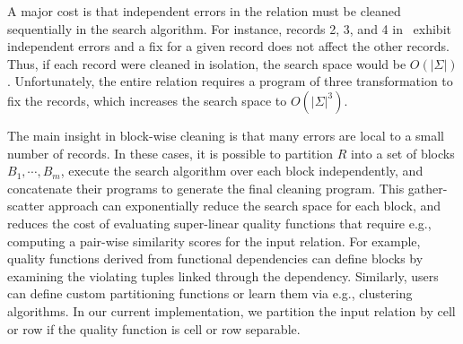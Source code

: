 

A major cost is that independent errors in the relation must be cleaned sequentially in the search algorithm.  For instance, records 2, 3, and 4 in~ exhibit independent errors and a fix for a given record does not affect the other records.  Thus, if each record were cleaned in isolation, the search space would be $O(|\Sigma|)$.  Unfortunately, the entire relation requires a program of three transformation to fix the records, which increases the search space to $O(|\Sigma|^3)$.

The main insight in block-wise cleaning is that many errors are local to a small number of records.  In these cases, it is possible to partition $R$ into a set of blocks $B_1,\cdots,B_m$, execute the search algorithm over each block independently, and concatenate their programs to generate the final cleaning program.  This gather-scatter approach can exponentially reduce the search space for each block, and reduces the cost of evaluating super-linear quality functions that require e.g., computing a pair-wise similarity scores for the input relation.    For example, quality functions derived from functional dependencies can define blocks by examining the violating tuples linked through the dependency.  Similarly, users can define custom partitioning functions or learn them via e.g., clustering algorithms.  In our current implementation, we partition the input relation by cell or row if the quality function is cell or row separable.


